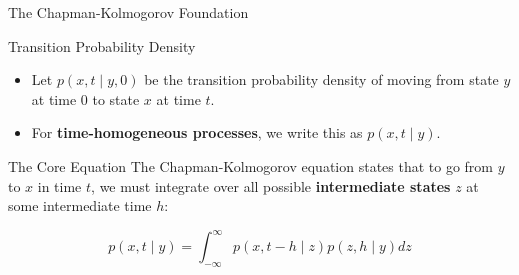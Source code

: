 \documentclass{beamer}
\begin{document}



\begin{frame}{The Chapman-Kolmogorov Foundation}

\begin{block}{Transition Probability Density}
\begin{itemize}
    \item Let $p(x, t \mid y, 0)$ be the transition probability density of moving from state $y$ at time $0$ to state $x$ at time $t$.
    \item For \textbf{time-homogeneous processes}, we write this as $p(x, t \mid y)$.
\end{itemize}
\end{block}

\vspace{0.2cm}

\begin{block}{The Core Equation}
The Chapman-Kolmogorov equation states that to go from $y$ to $x$ in time $t$, we must integrate over all possible \textbf{intermediate states} $z$ at some intermediate time $h$:



$$p(x, t \mid y) = \int_{-\infty}^{\infty} p(x, t - h \mid z) p(z, h \mid y) dz$$
\end{block}

\end{frame}
\end{document}
